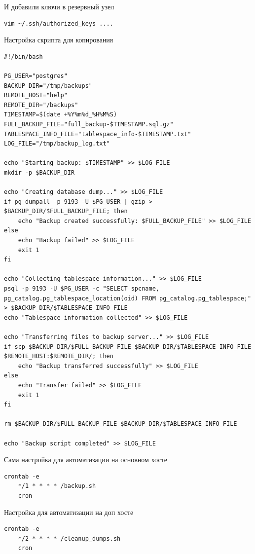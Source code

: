 \documentclass{article}
\begin{document}
И добавили ключи в резервный узел
\begin{lstlisting}[caption={kitty}, label={lst:example}]
    vim ~/.ssh/authorized_keys ....
\end{lstlisting}

Настройка скрипта для копирования
\begin{lstlisting}[caption={kitty}, label={lst:example}]
#!/bin/bash

PG_USER="postgres"
BACKUP_DIR="/tmp/backups"
REMOTE_HOST="help"
REMOTE_DIR="/backups"
TIMESTAMP=$(date +%Y%m%d_%H%M%S)
FULL_BACKUP_FILE="full_backup-$TIMESTAMP.sql.gz"
TABLESPACE_INFO_FILE="tablespace_info-$TIMESTAMP.txt"
LOG_FILE="/tmp/backup_log.txt"

echo "Starting backup: $TIMESTAMP" >> $LOG_FILE
mkdir -p $BACKUP_DIR

echo "Creating database dump..." >> $LOG_FILE
if pg_dumpall -p 9193 -U $PG_USER | gzip > $BACKUP_DIR/$FULL_BACKUP_FILE; then
    echo "Backup created successfully: $FULL_BACKUP_FILE" >> $LOG_FILE
else
    echo "Backup failed" >> $LOG_FILE
    exit 1
fi

echo "Collecting tablespace information..." >> $LOG_FILE
psql -p 9193 -U $PG_USER -c "SELECT spcname, pg_catalog.pg_tablespace_location(oid) FROM pg_catalog.pg_tablespace;" > $BACKUP_DIR/$TABLESPACE_INFO_FILE
echo "Tablespace information collected" >> $LOG_FILE

echo "Transferring files to backup server..." >> $LOG_FILE
if scp $BACKUP_DIR/$FULL_BACKUP_FILE $BACKUP_DIR/$TABLESPACE_INFO_FILE $REMOTE_HOST:$REMOTE_DIR/; then
    echo "Backup transferred successfully" >> $LOG_FILE
else
    echo "Transfer failed" >> $LOG_FILE
    exit 1
fi

rm $BACKUP_DIR/$FULL_BACKUP_FILE $BACKUP_DIR/$TABLESPACE_INFO_FILE

echo "Backup script completed" >> $LOG_FILE  
\end{lstlisting}

Сама настройка для автоматизации на основном хосте
\begin{lstlisting}[caption={kitty}, label={lst:example}]
    crontab -e 
    */1 * * * * /backup.sh
    cron
\end{lstlisting}

Настройка для автоматизации на доп хосте
\begin{lstlisting}[caption={kitty}, label={lst:example}]
    crontab -e 
    */2 * * * * /cleanup_dumps.sh
    cron
\end{lstlisting}
\end{document}
